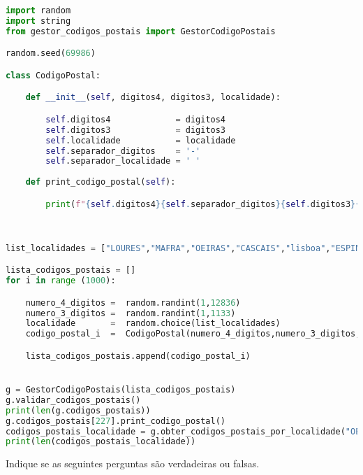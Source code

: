 \documentclass[12pt,varwidth=16cm,border=17pt]{standalone}
\begin{document}
\begin{lstlisting}[language=Python]
import random
import string
from gestor_codigos_postais import GestorCodigoPostais

random.seed(69986)

class CodigoPostal:

    def __init__(self, digitos4, digitos3, localidade):

        self.digitos4             = digitos4
        self.digitos3             = digitos3
        self.localidade           = localidade
        self.separador_digitos    = '-'
        self.separador_localidade = ' '
    
    def print_codigo_postal(self):

        print(f"{self.digitos4}{self.separador_digitos}{self.digitos3}{self.separador_localidade}{self.localidade}")

        

list_localidades = ["LOURES","MAFRA","OEIRAS","CASCAIS","lisboa","ESPINHO","MAIA","Amarante","valongo","OVAR","Pombal","Batalha"]

lista_codigos_postais = []
for i in range (1000):

    numero_4_digitos =  random.randint(1,12836)
    numero_3_digitos =  random.randint(1,1133)
    localidade       =  random.choice(list_localidades)
    codigo_postal_i  =  CodigoPostal(numero_4_digitos,numero_3_digitos,localidade)

    lista_codigos_postais.append(codigo_postal_i)


g = GestorCodigoPostais(lista_codigos_postais)
g.validar_codigos_postais()
print(len(g.codigos_postais))
g.codigos_postais[227].print_codigo_postal()
codigos_postais_localidade = g.obter_codigos_postais_por_localidade("OEIRAS")
print(len(codigos_postais_localidade))
\end{lstlisting}

Indique se as seguintes perguntas são verdadeiras ou falsas.
\end{document}
